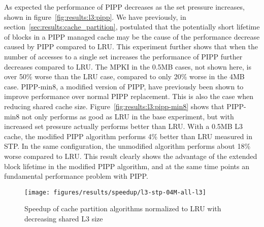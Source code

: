 As expected the performance of PIPP decreases as the set pressure increases, shown in figure~\ref{fig:results:l3:pipp}.
We have previously, in section~\ref{sec:results:cache_partition}, postulated that the potentially short lifetime of blocks in a PIPP managed cache may be the cause of the performance decrease caused by PIPP compared to LRU.
This experiment further shows that when the number of accesses to a single set increases the performance of PIPP further decreases compared to LRU.
The MPKI in the 0.5MB cases, not shown here, is over 50\% worse than the LRU case, compared to only 20\% worse in the 4MB case.
PIPP-min8, a modified version of PIPP, have previously been shown to improve performance over normal PIPP replacement.
This is also the case when reducing shared cache size.
Figure~\ref{fig:results:l3:pipp-min8} shows that PIPP-min8 not only performs as good as LRU in the base experiment, but with increased set pressure actually performs better than LRU.
With a 0.5MB L3 cache, the modified PIPP algorithm performs 4\% better than LRU measured in STP.
In the same configuration, the unmodified algorithm performs about 18\% worse compared to LRU.
This result clearly shows the advantage of the extended block lifetime in the modified PIPP algorithm, and at the same time points an fundamental performance problem with PIPP.

\begin{figure}[htb]
    \centering
    \texttt{[image: figures/results/speedup/l3-stp-04M-all-l3]}
    \caption{Speedup of cache partition algorithms normalized to LRU with decreasing shared L3 size}
    \label{fig:results:l3}
\end{figure}



